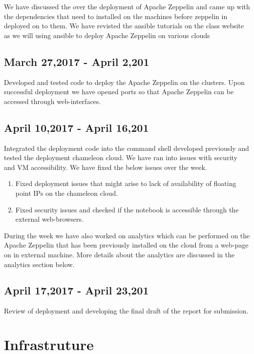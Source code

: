 \documentclass[9pt,twocolumn,twoside]{../../styles/osajnl}
\begin{document}
We have discussed the over the deployment of Apache Zeppelin and came 
up with the dependencies that need to installed on the machines 
before zeppelin in deployed on to them. We have revisted the ansible 
tutorials on the class website as we will using ansible to deploy 
Apache Zeppelin on various clouds

\subsection{March 27,2017 - April 2,201}

Developed and tested code to deploy the Apache Zeppelin on the 
clusters. Upon successful deployment we have opened ports so that 
Apache Zeppelin can be accessed through web-interfaces.

\subsection{April 10,2017 - April 16,201}

Integrated the deployment code into the command shell developed 
previously and tested the deployment chameleon cloud. We have ran 
into issues with security and VM accessibility. We have fixed the 
below issues over the week.
\begin{enumerate}
	\item Fixed deployment issues that might arise to lack of 
	availability of  floating point IPs on the chameleon cloud. 
	\item Fixed security issues and checked if the notebook is 
	accessible through the external web-browsers.
\end{enumerate}

During the week we have also worked on analytics which can be 
performed on the Apache Zeppelin that has been previously installed 
on the cloud from a web-page on in external machine. More details 
about the analytics are discussed in the analytics section below.
 
\subsection{April 17,2017 - April 23,201}

Review of deployment and developing the final draft of the report for 
submission.

\section{Infrastruture}
\end{document}
